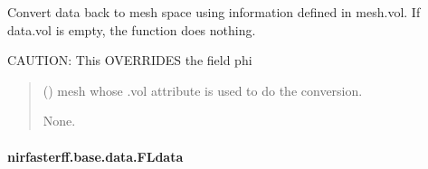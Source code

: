 \documentclass[letterpaper,10pt,english]{sphinxmanual}
\begin{document}
\begin{fulllineitems}
\begin{fulllineitems}
\label{\detokenize{_autosummary/nirfasterff.base.data.FDdata:nirfasterff.base.data.FDdata.tomesh}}
\pysigstartsignatures
\pysiglinewithargsret
{}
{}
{}
\pysigstopsignatures
\sphinxAtStartPar
Convert data back to mesh space using information defined in mesh.vol. If data.vol is empty, the function does nothing.

\sphinxAtStartPar
CAUTION: This OVERRIDES the field phi
\begin{quote}\begin{description}
\sphinxAtStartPar
{} () \textendash{} mesh whose .vol attribute is used to do the conversion.

\sphinxAtStartPar
None.

\end{description}\end{quote}

\end{fulllineitems}


\end{fulllineitems}


\sphinxstepscope


\paragraph{nirfasterff.base.data.FLdata}
\label{\detokenize{_autosummary/nirfasterff.base.data.FLdata:nirfasterff-base-data-fldata}}\label{\detokenize{_autosummary/nirfasterff.base.data.FLdata::doc}}
\end{document}
